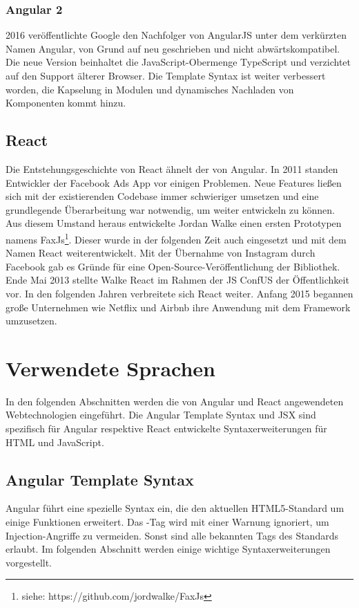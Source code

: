 \subsubsection{Angular 2}
2016 veröffentlichte Google den Nachfolger von AngularJS unter dem verkürzten Namen Angular, von Grund auf neu geschrieben und nicht abwärtskompatibel. Die neue Version beinhaltet die JavaScript-Obermenge TypeScript und verzichtet auf den Support älterer Browser. Die Template Syntax ist weiter verbessert worden, die Kapselung in Modulen und dynamisches Nachladen von Komponenten kommt hinzu. \cite{AngularWiki}

\subsection{React}
Die Entstehungsgeschichte von React ähnelt der von Angular. In 2011 standen Entwickler der Facebook Ads App vor einigen Problemen. Neue Features ließen sich mit der existierenden Codebase immer schwieriger umsetzen und eine grundlegende Überarbeitung war notwendig, um weiter entwickeln zu können. Aus diesem Umstand heraus entwickelte Jordan Walke einen ersten Prototypen namens FaxJs\footnote{siehe: https://github.com/jordwalke/FaxJs}. Dieser wurde in der folgenden Zeit auch eingesetzt und mit dem Namen React weiterentwickelt. Mit der Übernahme von Instagram durch Facebook gab es Gründe für eine Open-Source-Veröffentlichung der Bibliothek. Ende Mai 2013 stellte Walke React im Rahmen der JS ConfUS der Öffentlichkeit vor. In den folgenden Jahren verbreitete sich React weiter. Anfang 2015 begannen große Unternehmen wie Netflix und Airbnb ihre Anwendung mit dem Framework umzusetzen.\cite{ReactTimeline}

\section{Verwendete Sprachen}
In den folgenden Abschnitten werden die von Angular und React angewendeten Webtechnologien eingeführt. Die Angular Template Syntax und JSX sind spezifisch für Angular respektive React entwickelte Syntaxerweiterungen für HTML und JavaScript.

\subsection{Angular Template Syntax}
Angular führt eine spezielle Syntax ein, die den aktuellen HTML5-Standard um einige Funktionen erweitert. Das -Tag wird mit einer Warnung ignoriert, um Injection-Angriffe zu vermeiden. Sonst sind alle bekannten Tags des Standards erlaubt. Im folgenden Abschnitt werden einige wichtige Syntaxerweiterungen vorgestellt.

